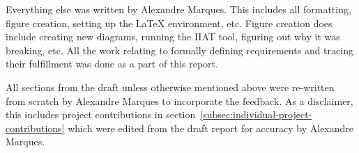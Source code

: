 Everything else was written by Alexandre Marques.
This includes all formatting, figure creation, setting up the LaTeX environment, etc.
Figure creation does include creating new diagrams, running the IIAT tool,
figuring out why it was breaking, etc.
All the work relating to formally defining requirements and tracing their fulfillment was done as a part of this report.

All sections from the draft unless otherwise mentioned above were re-written from scratch by Alexandre Marques to incorporate the feedback.
As a disclaimer, this includes project contributions in section~\ref{subsec:individual-project-contributions}
which were edited from the draft report for accuracy by Alexandre Marques.
